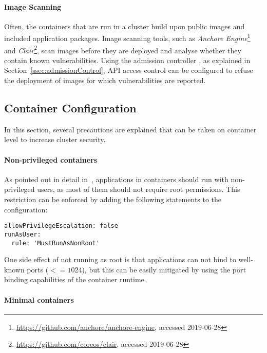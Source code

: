 \paragraph{Image Scanning} 

Often, the containers that are run in a cluster build upon public images and included application packages. Image scanning tools, such as \textit{Anchore Engine}\footnote{\url{https://github.com/anchore/anchore-engine}, accessed 2019-06-28} and \textit{Clair}\footnote{\url{https://github.com/coreos/clair}, accessed 2019-06-28}, scan images before they are deployed and analyse whether they contain known vulnerabilities. Using the admission controller , as explained in Section~\ref{ssec:admissionControl}, API access control can be configured to refuse the deployment of images for which vulnerabilities are reported.  

\subsection{Container Configuration}

In this section, several precautions are explained that can be taken on container level to increase cluster security.

\paragraph{Non-privileged containers}

As pointed out in detail in~\textcite{nonPrivContainers}, applications in containers should run with non-privileged users, as most of them should not require root permissions. This restriction can be enforced by adding the following statements to the  configuration:

\begin{verbatim}
allowPrivilegeEscalation: false
runAsUser:
  rule: 'MustRunAsNonRoot'
\end{verbatim}

One side effect of not running as root is that applications can not bind to well-known ports ($<= 1024$), but this can be easily mitigated by using the port binding capabilities of the container runtime.

\paragraph{Minimal containers}

